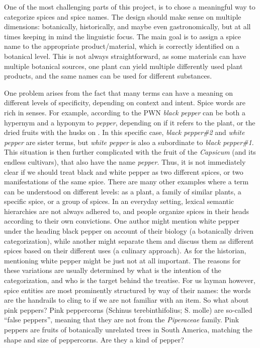 One of the most challenging parts of this project, is to chose a meaningful way to categorize spices and spice names. The design should make sense on multiple dimensions: botanically, historically, and maybe even gastronomically, but at all times keeping in mind the linguistic focus. The main goal is to assign a spice name to the appropriate product/material, which is correctly identified on a botanical level. This is not always straightforward, as some materials can have multiple botanical sources, one plant can yield multiple differently used plant products, and the same names can be used for different substances. 

One problem arises from the fact that many terms can have a meaning on different levels of specificity, depending on context and intent. Spice words are rich in senses. For example, according to the \gls{PWN} \textit{black pepper} can be both a hypernym and a hyponym to \textit{pepper}, depending on if it refers to the plant, or the dried fruits with the husks on \autocite{fellbaum_wordnet_1998}. In this specific case, \textit{black pepper\#2} and \textit{white pepper} are sister terms, but \textit{white pepper} is also a subordinate to \textit{black pepper\#1}. This situation is then further complicated with the fruit of the \textit{Capsicum} (and its endless cultivars), that also have the name \textit{pepper}. Thus, it is not immediately clear if we should treat black and white pepper as two different spices, or two manifestations of the same spice. There are many other examples where a term can be understood on different levels: as a plant, a family of similar plants, a specific spice, or a group of spices. In an everyday setting, lexical semantic hierarchies are not always adhered to, and people organize spices in their heads according to their own convictions. One author might mention white pepper under the heading black pepper on account of their biology (a botanically driven categorization), while another might separate them and discuss them as different spices based on their different uses (a culinary approach). As for the historian, mentioning white pepper might be just not at all important. The reasons for these variations are usually determined by what is the intention of the categorization, and who is the target behind the treatise. For us layman however, spice entities are most prominently structured by way of their names: the words are the handrails to cling to if we are not familiar with an item. So what about pink peppers? Pink peppercorns (Schinus terebinthifolius; S. molle) are so-called ``false peppers'', meaning that they are not from the \textit{Piperaceae} family. Pink peppers are fruits of botanically unrelated trees in South America, matching the shape and size of peppercorns. Are they a kind of pepper?

